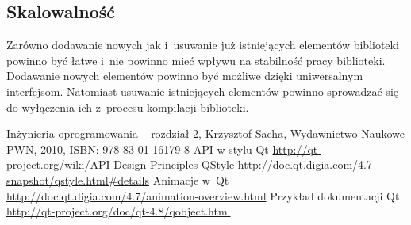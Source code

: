 \documentclass[11pt,twoside,a4paper,final]{article}
\begin{document}

\subsection{Skalowalność}
Zarówno dodawanie nowych jak i~usuwanie już istniejących elementów biblioteki powinno być łatwe i~nie powinno mieć wpływu na stabilność pracy biblioteki. Dodawanie nowych elementów powinno być możliwe dzięki uniwersalnym interfejsom. Natomiast usuwanie istniejących elementów powinno sprowadzać się do wyłączenia ich z~procesu kompilacji biblioteki.

\begin{thebibliography}{}
Inżynieria oprogramowania -- rozdział 2, Krzysztof Sacha, Wydawnictwo Naukowe PWN, 2010, ISBN: 978-83-01-16179-8
API w stylu Qt \url{http://qt-project.org/wiki/API-Design-Principles}
QStyle \url{http://doc.qt.digia.com/4.7-snapshot/qstyle.html#details}
Animacje w~Qt \url{http://doc.qt.digia.com/4.7/animation-overview.html}
Przykład dokumentacji Qt \url{http://qt-project.org/doc/qt-4.8/qobject.html}


\end{thebibliography}
\end{document}
